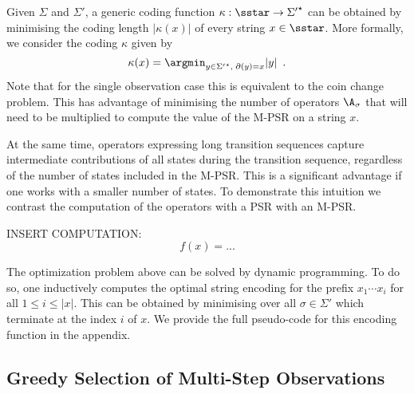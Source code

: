 Given $\Sigma$ and $\Sigma'$, a generic coding function $\kappa : \sstar \to {\Sigma'}^\star$ can be obtained by minimising the coding length $|\kappa(x)|$ of every string $x \in \sstar$. More formally, we consider the coding $\kappa$ given by
\begin{equation*}
\kappa(x) = \argmin_{y \in {\Sigma'}^\star, \; \partial(y) = x} |y| \enspace.
\end{equation*}
Note that for the single observation case this is equivalent to the coin change problem. This has advantage of minimising the number of operators $\A_\sigma$ that will need to be multiplied to compute the value of the M-PSR on a string $x$. 

At the same time, operators expressing long transition sequences capture intermediate contributions of all states during the transition sequence, regardless of the number of states included in the M-PSR. This is a significant advantage if one works with a smaller number of states. To demonstrate this intuition we contrast the computation of the operators with a PSR with an M-PSR.

INSERT COMPUTATION:
\begin{equation*}
f(x) = ...
\end{equation*}

%

The optimization problem above can be solved by dynamic programming. To do so, one inductively computes the optimal string encoding for the prefix $x_1 \cdots x_i$ for all $1 \leq i \leq |x|$. This can be obtained by minimising over all $\sigma \in \Sigma'$ which terminate at the index $i$ of $x$. We provide the full pseudo-code for this encoding function in the appendix.

\subsection{Greedy Selection of Multi-Step Observations}

